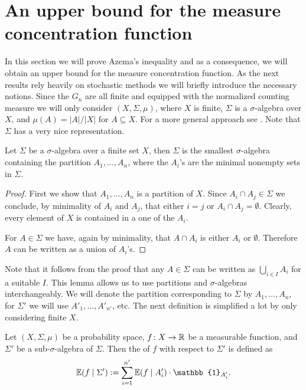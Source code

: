 \section{An upper bound for the measure concentration function}
In this section we will prove Azema's inequality and as a consequence, we will obtain an upper bound for the measure concentration function. As the next results rely heavily on stochastic methods we will briefly introduce the necessary notions. Since the $G_n$ are all finite and equipped with the normalized counting measure we will only consider  $(X,\Sigma,\mu)$, where $X$ is finite, $\Sigma$ is a $\sigma$-algebra over $X$, and $\mu(A)=|A|/|X|$ for $A\subseteq X$. For a more general approach see \cite{azema}. Note that $\Sigma$ has a very nice representation.%

\begin{lemma}
Let $\Sigma$ be a $\sigma$-algebra over a finite set $X$, then $\Sigma$ is the smallest $\sigma$-algebra containing the partition $A_1,\dots,A_n$, where the $A_i$'s are the minimal nonempty sets in $\Sigma$.
\end{lemma}
\begin{proof}
First we show that $A_1,\dots,A_n$ is a  partition of $X$. Since $A_i\cap A_j\in\Sigma$ we conclude, by minimality of $A_i$ and $A_j$, that either $i=j$ or $A_i\cap A_j=\emptyset$. Clearly, every element of $X$ is contained in a one of the $A_i$. 

For $A\in\Sigma$ we have, again by minimality, that $A\cap A_i$ is either $A_i$ or $\emptyset$. Therefore $A$ can be written as a union of $A_i$'s.
\end{proof}
Note that it follows from the proof that any $A\in\Sigma$ can be written as $\bigcup_{i\in I}A_i$ for a suitable $I$. This lemma allows us to use partitions and $\sigma$-algebras interchangeably. We will denote the partition corresponding to $\Sigma$ by $A_1,\dots,A_n$, for $\Sigma'$ we will use $A'_1,\dots,A'_{n'}$, etc. The next definition is simplified a lot by only considering finite $X$.

\begin{definition}
Let $(X,\Sigma,\mu)$ be a probability space, $f\colon X\to \mathbb{R}$ be a measurable function, and $\Sigma'$ be a sub-$\sigma$-algebra of $\Sigma$. Then the  of $f$ with respect to $\Sigma'$ is defined as
\[\E(f\mid \Sigma'):=\sum_{i=1}^{n'}\E(f\mid A'_i)\cdot \mathbb{1}_{A'_i}.\]
\end{definition}

